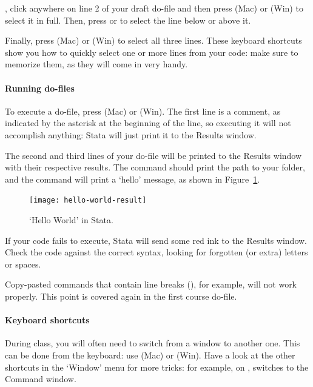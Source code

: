 , click anywhere on line 2 of your draft do-file and then press  (Mac) or  (Win) to select it in full. Then, press  or  to select the line below or above it.%

Finally, press  (Mac) or  (Win) to select all three lines. These keyboard shortcuts show you how to quickly select one or more lines from your code: make sure to memorize them, as they will come in very handy.%

\paragraph{Running do-files}

To execute a do-file, press  (Mac) or  (Win). The first line is a comment, as indicated by the asterisk at the beginning of the line, so executing it will not accomplish anything: Stata will just print it to the Results window.%

The second and third lines of your do-file will be printed to the Results window with their respective results. The  command should print the path to your \SRQM folder, and the  command will print a `hello' message, as shown in Figure~\ref{fig:hello-world-result}.%

\begin{figure}%
  \texttt{[image: hello-world-result]}

  \caption{`Hello World' in Stata.}
  \label{fig:hello-world-result}
\end{figure}

 If your code fails to execute, Stata will send some red ink to the Results window. Check the code against the correct syntax, looking for forgotten (or extra) letters or spaces.%

 Copy-pasted commands that contain line breaks (\cmd{///}), for example, will not work properly. This point is covered again in the first course do-file.

\paragraph{Keyboard shortcuts}

During class, you will often need to switch from a window to another one. This can be done from the keyboard: use  (Mac) or  (Win). Have a look at the other shortcuts in the `Window' menu for more tricks: for example, on \OSX,  switches to the Command window.%



